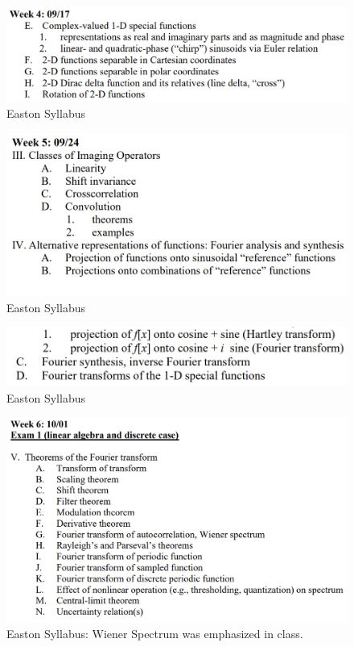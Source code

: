 \documentclass{article}
\begin{document}
\begin{figure}[h!]
\centering
\includegraphics[scale=.65]{Fourier/Week 4/Week4.1.png}
\caption{Easton Syllabus}
\label{fig:Snowm6an}
\end{figure}

\begin{figure}[h!]
\centering
\includegraphics[scale=.65]{Fourier/Week 5/Week5.1.png}
\caption{Easton Syllabus}
\label{fig:Syllabu7s}
\end{figure}


\begin{figure}[h!]
\centering
\includegraphics[scale=.65]{Fourier/Week 5/Week5.2.png}
\caption{Easton Syllabus}
\label{fig:Syllab4us}
\end{figure}


\begin{figure}[h!]
\centering
\includegraphics[scale=.65]{Fourier/Week 6/Week6.1.png}
\caption{Easton Syllabus: Wiener Spectrum was emphasized in class.}
\label{fig:Sylla3bus}
\end{figure}
\end{document}
